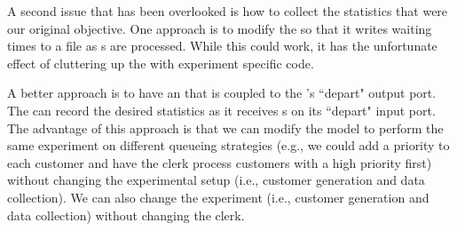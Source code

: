 A second issue that has been overlooked is how to collect the
statistics that were our original objective. One approach is to
modify the  so that it writes waiting times to a file as
s are processed. While this could work, it has the
unfortunate effect of cluttering up the  with experiment
specific code. 

A better approach is to have an  that is
coupled to the 's ``depart" output port. The
 can record the desired statistics as it receives s
on its ``depart" input port. The advantage of this
approach is that we can modify the  model to perform the same
experiment on different queueing strategies (e.g., we could add a
priority to each customer and have the clerk process customers
with a high priority first) without changing the experimental
setup (i.e., customer generation and data collection). We can also
change the experiment (i.e., customer generation and data collection)
without changing the clerk.

